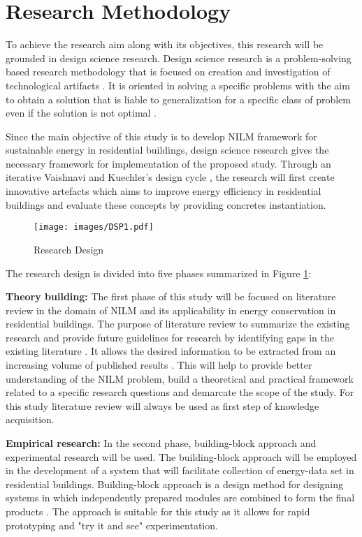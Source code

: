 \section{Research Methodology}
To achieve the research aim along with its objectives, this research will be grounded in design science research. Design science research is a problem-solving based research methodology that is focused on creation and investigation of technological artifacts  \citep{Hevner2004,Dresch2015,Wieringa2014}. It is oriented in solving a specific problems with the aim to obtain a solution that is liable to generalization for a specific class of problem even if the solution is not optimal \citep{Dresch2015}.

Since the main objective of this study is to develop NILM framework for sustainable energy in residential buildings, design science research gives the necessary framework for implementation of the proposed study. Through an iterative Vaishnavi and Kuechler's design cycle \citep{Tobergte2013}, the research will first create innovative artefacts which aims to improve energy efficiency in residential buildings and evaluate these concepts by providing concretes 
instantiation. 
\begin{figure}[ht]
	\centering
	\texttt{[image: images/DSP1.pdf]}
	\caption{Research Design}
	\label{fig:design_science}
\end{figure}

The research design is divided into five phases summarized in Figure \ref{fig:design_science}:

\textbf{Theory building:} The first phase of this study will be focused on literature review in the domain of NILM and its applicability in energy conservation in residential buildings. The purpose of literature review  to summarize the existing research and provide
future guidelines for research by identifying gaps in the existing literature \citep{Compton1993}. It allows the desired information to be extracted from an increasing volume of published results \citep{Seuring2012}. This will help to provide better understanding of the NILM problem, build a theoretical and practical framework related to a specific research questions and demarcate the scope of the study. For this study literature review will always be used as first step of knowledge acquisition.


\textbf{Empirical research:} In the second phase, building-block approach and experimental research will be used. The building-block approach will be employed in the development of a system that will facilitate collection of energy-data set in residential buildings. Building-block approach is a design method  for designing systems in which independently prepared modules are combined to form the final products \citep{Dutta2008}. The approach is suitable for this study as it allows for rapid prototyping and "try it and see" experimentation. 

